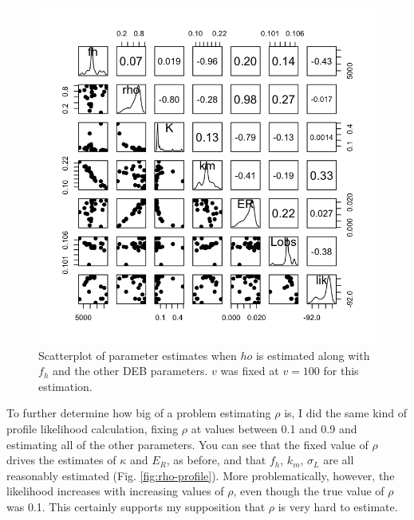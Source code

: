\documentclass[12pt,reqno,final,pdftex]{amsart}\usepackage[]{graphicx}\usepackage[]{color}
\newenvironment{knitrout}{}{} %
\theoremstyle{plain}
\numberwithin{equation}{part}
\begin{document}
\begin{knitrout}\scriptsize
{}\color{fgcolor}\begin{figure}

\includegraphics[width=\linewidth]{figure/estimating-rho-1} \hfill{}

\caption[Scatterplot of parameter estimates when ]{Scatterplot of parameter estimates when $
ho$ is estimated along with $f_h$ and the other DEB parameters. $v$ was fixed at $v=100$ for this estimation.}\label{fig:estimating-rho}
\end{figure}


\end{knitrout}

To further determine how big of a problem estimating $\rho$ is, I did the same kind of profile likelihood calculation, fixing $\rho$ at values between 0.1 and 0.9 and estimating all of the other parameters.
You can see that the fixed value of $\rho$ drives the estimates of $\kappa$ and $E_R$, as before, and that $f_h$, $k_m$, $\sigma_L$ are all reasonably estimated (Fig. \ref{fig:rho-profile}).
More problematically, however, the likelihood increases with increasing values of $\rho$, even though the true value of $\rho$ was 0.1.
This certainly supports my supposition that $\rho$ is very hard to estimate.
\end{document}
